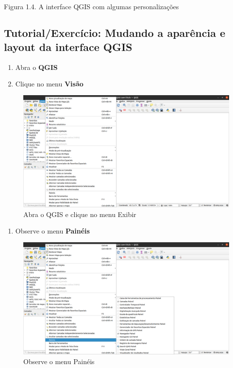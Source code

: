 \documentclass[
]{krantz}
\providecommand{\tightlist}{%
  \setlength{\itemsep}{0pt}\setlength{\parskip}{0pt}}
\begin{document}
Figura 1.4. A interface QGIS com algumas personalizações

\hypertarget{tutorialexercuxedcio-mudando-a-aparuxeancia-e-layout-da-interface-qgis}{%
\subsection{Tutorial/Exercício: Mudando a aparência e layout da interface QGIS}\label{tutorialexercuxedcio-mudando-a-aparuxeancia-e-layout-da-interface-qgis}}

\begin{enumerate}
\def\labelenumi{\arabic{enumi}.}
\tightlist
\item
  Abra o \textbf{QGIS}
\item
  Clique no menu \textbf{Visão}
\end{enumerate}

\begin{figure}
\centering
\includegraphics{media/modulo1/ex01-01.png}
\caption{Abra o QGIS e clique no menu Exibir}
\end{figure}

\begin{enumerate}
\def\labelenumi{\arabic{enumi}.}
\setcounter{enumi}{2}
\tightlist
\item
  Observe o menu \textbf{Painéis}
\end{enumerate}

\begin{figure}
\centering
\includegraphics{media/modulo1/ex01-02.png}
\caption{Observe o menu Painéis}
\end{figure}
\end{document}
